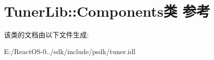 \hypertarget{class_tuner_lib_1_1_components}{}\section{Tuner\+Lib\+:\+:Components类 参考}
\label{class_tuner_lib_1_1_components}


该类的文档由以下文件生成\+:\begin{DoxyCompactItemize}
\item 
E\+:/\+React\+O\+S-\/0../sdk/include/psdk/tuner.\+idl\end{DoxyCompactItemize}
